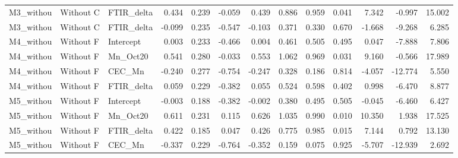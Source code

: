 \documentclass[preprint,12pt]{elsarticle}
\begin{document}
\begin{landscape}
\begin{table}[htbp]
\begin{tabular}{lllrrrrrrrrrr}
M3\_withou & Without C & FTIR\_delta & 0.434 & 0.239 & -0.059 & 0.439 & 0.886 & 0.959 & 0.041 & 7.342 & -0.997 & 15.002 \\
M3\_withou & Without C & FTIR\_delta & -0.099 & 0.235 & -0.547 & -0.103 & 0.371 & 0.330 & 0.670 & -1.668 & -9.268 & 6.285 \\
M4\_withou & Without F & Intercept & 0.003 & 0.233 & -0.466 & 0.004 & 0.461 & 0.505 & 0.495 & 0.047 & -7.888 & 7.806 \\
M4\_withou & Without F & Mn\_Oct20 & 0.541 & 0.280 & -0.033 & 0.553 & 1.062 & 0.969 & 0.031 & 9.160 & -0.566 & 17.989 \\
M4\_withou & Without F & CEC\_Mn & -0.240 & 0.277 & -0.754 & -0.247 & 0.328 & 0.186 & 0.814 & -4.057 & -12.774 & 5.550 \\
M4\_withou & Without F & FTIR\_delta & 0.059 & 0.229 & -0.382 & 0.055 & 0.524 & 0.598 & 0.402 & 0.998 & -6.470 & 8.877 \\
M5\_withou & Without F & Intercept & -0.003 & 0.188 & -0.382 & -0.002 & 0.380 & 0.495 & 0.505 & -0.045 & -6.460 & 6.427 \\
M5\_withou & Without F & Mn\_Oct20 & 0.611 & 0.231 & 0.115 & 0.626 & 1.035 & 0.990 & 0.010 & 10.350 & 1.938 & 17.525 \\
M5\_withou & Without F & FTIR\_delta & 0.422 & 0.185 & 0.047 & 0.426 & 0.775 & 0.985 & 0.015 & 7.144 & 0.792 & 13.130 \\
M5\_withou & Without F & CEC\_Mn & -0.337 & 0.229 & -0.764 & -0.352 & 0.159 & 0.075 & 0.925 & -5.707 & -12.939 & 2.692 \\
\bottomrule
\end{tabular}
\endgroup
\end{table}
\end{landscape}
\clearpage
  
\end{document}
